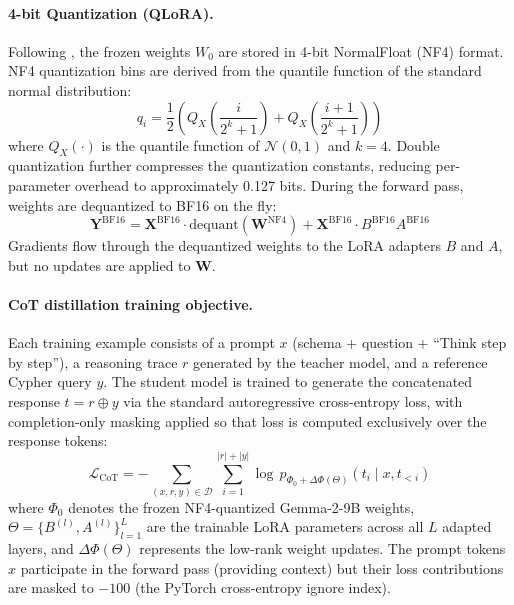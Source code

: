 \documentclass[11pt]{article}
\begin{document}
\paragraph{4-bit Quantization (QLoRA).} Following \citet{dettmers2023qlora}, the frozen weights $W_0$ are stored in 4-bit NormalFloat (NF4) format. NF4 quantization bins are derived from the quantile function of the standard normal distribution:
\begin{equation}
    q_i = \frac{1}{2}\left(Q_X\!\left(\frac{i}{2^k + 1}\right) + Q_X\!\left(\frac{i+1}{2^k + 1}\right)\right)
\end{equation}
where $Q_X(\cdot)$ is the quantile function of $\mathcal{N}(0,1)$ and $k=4$. Double quantization further compresses the quantization constants, reducing per-parameter overhead to approximately 0.127 bits. During the forward pass, weights are dequantized to BF16 on the fly:
\begin{equation}
    \mathbf{Y}^{\text{BF16}} = \mathbf{X}^{\text{BF16}} \cdot \text{dequant}(\mathbf{W}^{\text{NF4}}) + \mathbf{X}^{\text{BF16}} \cdot B^{\text{BF16}} A^{\text{BF16}}
\end{equation}
Gradients flow through the dequantized weights to the LoRA adapters $B$ and $A$, but no updates are applied to $\mathbf{W}$.

\paragraph{CoT distillation training objective.} Each training example consists of a prompt $x$ (schema + question + ``Think step by step''), a reasoning trace $r$ generated by the teacher model, and a reference Cypher query $y$. The student model is trained to generate the concatenated response $t = r \oplus y$ via the standard autoregressive cross-entropy loss, with completion-only masking applied so that loss is computed exclusively over the response tokens:
\begin{equation}
    \mathcal{L}_{\text{CoT}} = -\sum_{(x, r, y) \in \mathcal{D}} \sum_{i=1}^{|r|+|y|} \log\, p_{\Phi_0 + \Delta\Phi(\Theta)}(t_i \mid x, t_{<i})
    \label{eq:cot_loss}
\end{equation}
where $\Phi_0$ denotes the frozen NF4-quantized Gemma-2-9B weights, $\Theta = \{B^{(l)}, A^{(l)}\}_{l=1}^{L}$ are the trainable LoRA parameters across all $L$ adapted layers, and $\Delta\Phi(\Theta)$ represents the low-rank weight updates. The prompt tokens $x$ participate in the forward pass (providing context) but their loss contributions are masked to $-100$ (the PyTorch cross-entropy ignore index).
\end{document}
